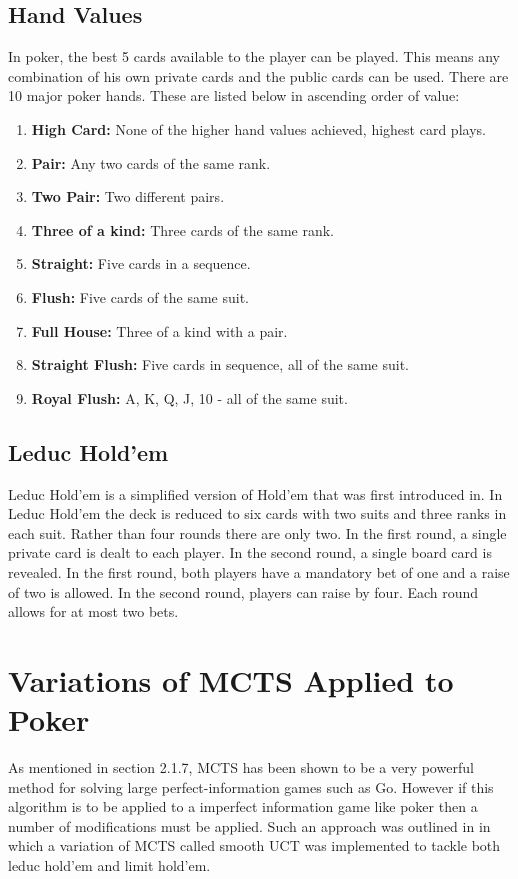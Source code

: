 \subsection{Hand Values}\label{subsec:handValues}
In poker, the best 5 cards available to the player can be played.
This means any combination of his own private cards and the public cards can be used.
There are 10 major poker hands.
These are listed below in ascending order of value:
\begin{enumerate}
    \item \textbf{High Card:} None of the higher hand values achieved, highest card plays.
    \item \textbf{Pair:} Any two cards of the same rank.
    \item \textbf{Two Pair:} Two different pairs.
    \item \textbf{Three of a kind:} Three cards of the same rank.
    \item \textbf{Straight:} Five cards in a sequence.
    \item \textbf{Flush:} Five cards of the same suit.
    \item \textbf{Full House:} Three of a kind with a pair.
    \item \textbf{Straight Flush:} Five cards in sequence, all of the same suit.
    \item \textbf{Royal Flush:} A, K, Q, J, 10 - all of the same suit.
\end{enumerate}

\subsection{Leduc Hold'em}\label{subsec:leducHoldem}
Leduc Hold'em is a simplified version of Hold'em that was first introduced in\citep{southey2012bayes}.
In Leduc Hold'em the deck is reduced to six cards with two suits and three ranks in each suit.
Rather than four rounds there are only two.
In the first round, a single private card is dealt to each player.
In the second round, a single board card is revealed.
In the first round, both players have a mandatory bet of one and a raise of two is allowed.
In the second round, players can raise by four.
Each round allows for at most two bets.


\section{Variations of MCTS Applied to Poker}\label{sec:mctsPoker}
As mentioned in section 2.1.7, MCTS has been shown to be a very powerful method for solving large
perfect-information games such as Go.
However if this algorithm is to be applied to a imperfect information game like poker then
a number of modifications must be applied.
Such an approach was outlined in\citep{heinrich2017reinforcement} in which a variation of
MCTS called smooth UCT was implemented to tackle both leduc hold'em and limit hold'em.

